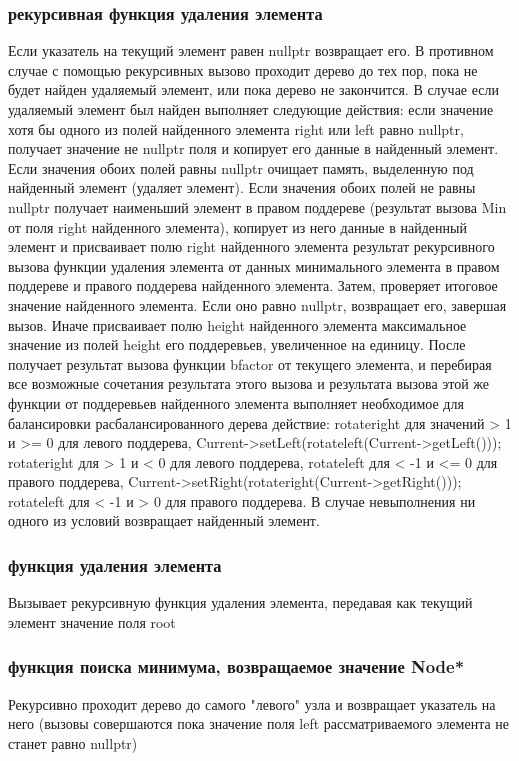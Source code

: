 \documentclass[a4paper,12pt]{article}
\begin{document}
\begin{enumerate}
      \subsubsection{рекурсивная функция удаления элемента}
      Если указатель на текущий элемент равен nullptr возвращает его. В противном случае с помощью рекурсивных вызово проходит дерево до тех пор, пока не будет найден удаляемый элемент, или пока дерево не закончится. В случае если удаляемый элемент был найден выполняет следующие действия: если значение хотя бы одного из полей найденного элемента right или left равно nullptr, получает значение не nullptr поля и копирует его данные в найденный элемент. Если значения обоих полей равны nullptr очищает память, выделенную под найденный элемент (удаляет элемент). Если значения обоих полей не равны nullptr получает наименьший элемент в правом поддереве (результат вызова Min от поля right найденного элемента), копирует из него данные в найденный элемент и присваивает полю right найденного элемента результат рекурсивного вызова функции удаления элемента от данных минимального элемента в правом поддереве и правого поддерева найденного элемента. Затем, проверяет итоговое значение найденного элемента. Если оно равно nullptr, возвращает его, завершая вызов. Иначе присваивает полю height найденного элемента максимальное значение из полей height его поддеревьев, увеличенное на единицу. После получает результат вызова функции bfactor от текущего элемента, и перебирая все возможные сочетания результата этого вызова и результата вызова этой же функции от поддеревьев найденного элемента выполняет необходимое для балансировки расбалансированного дерева действие: rotateright для значений > 1 и >= 0 для левого поддерева, Current->setLeft(rotateleft(Current->getLeft())); rotateright для > 1 и < 0 для левого поддерева, rotateleft для < -1 и <= 0 для правого поддерева, Current->setRight(rotateright(Current->getRight())); rotateleft для < -1 и > 0 для правого поддерева. В случае невыполнения ни одного из условий возвращает найденный элемент.
      
      \subsubsection{функция удаления элемента}
      Вызывает рекурсивную функция удаления элемента, передавая как текущий элемент значение поля root
      
      \subsubsection{функция поиска минимума, возвращаемое значение Node*}
      Рекурсивно проходит дерево до самого "левого" узла и возвращает указатель на него (вызовы совершаются пока значение поля left рассматриваемого элемента не станет равно nullptr)
      

\end{enumerate}
\end{document}
